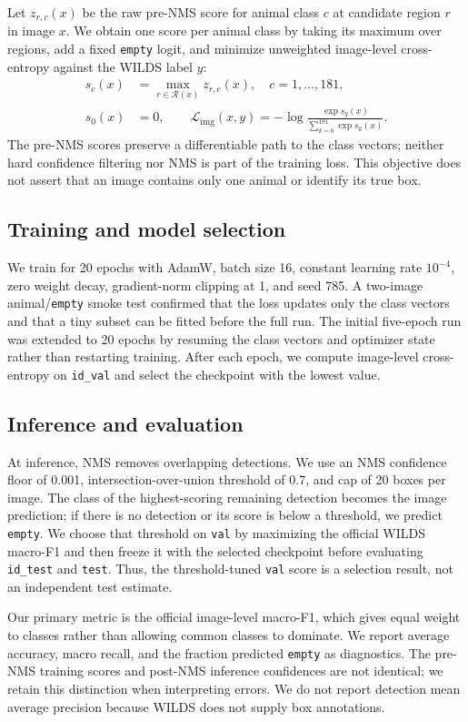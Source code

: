\documentclass{article}
\begin{document}
Let $z_{r,c}(x)$ be the raw pre-NMS score for animal class $c$ at candidate region
$r$ in image $x$. We obtain one score per animal class by taking its maximum over
regions, add a fixed \texttt{empty} logit, and minimize unweighted image-level
cross-entropy against the WILDS label $y$:
\begin{align}
s_c(x)&=\max_{r\in\mathcal R(x)} z_{r,c}(x),\quad c=1,\ldots,181,\nonumber\\
s_0(x)&=0,\qquad
\mathcal L_{\mathrm{img}}(x,y)
=-\log\frac{\exp s_y(x)}{\sum_{k=0}^{181}\exp s_k(x)}.
\end{align}
The pre-NMS scores preserve a differentiable path to the class vectors; neither
hard confidence filtering nor NMS is part of the training loss. This objective
does not assert that an image contains only one animal or identify its true box.

\subsection{Training and model selection}
We train for 20 epochs with AdamW, batch size 16, constant learning rate $10^{-4}$,
zero weight decay, gradient-norm clipping at 1, and seed 785. A two-image
animal/\texttt{empty} smoke test confirmed that the loss updates only the class
vectors and that a tiny subset can be fitted before the full run. The initial
five-epoch run was extended to 20 epochs by resuming the class vectors and optimizer
state rather than restarting training. After each epoch, we compute image-level
cross-entropy on \texttt{id\_val} and select the checkpoint with the lowest value.

\subsection{Inference and evaluation}
At inference, NMS removes overlapping detections. We use
an NMS confidence floor of 0.001, intersection-over-union threshold of 0.7, and cap
of 20 boxes per image. The class of the highest-scoring remaining detection becomes
the image prediction; if there is no detection or its score is below a threshold,
we predict \texttt{empty}. We choose that threshold on \texttt{val} by maximizing
the official WILDS macro-F1 and then freeze it with the selected checkpoint before
evaluating \texttt{id\_test} and \texttt{test}. Thus, the threshold-tuned
\texttt{val} score is a selection result, not an independent test estimate.

Our primary metric is the official image-level macro-F1, which gives equal weight
to classes rather than allowing common classes to dominate. We report average
accuracy, macro recall, and the fraction predicted \texttt{empty} as diagnostics.
The pre-NMS training scores and post-NMS inference confidences are not identical;
we retain this distinction when interpreting errors. We do not report detection
mean average precision because WILDS does not supply box annotations.
\end{document}
